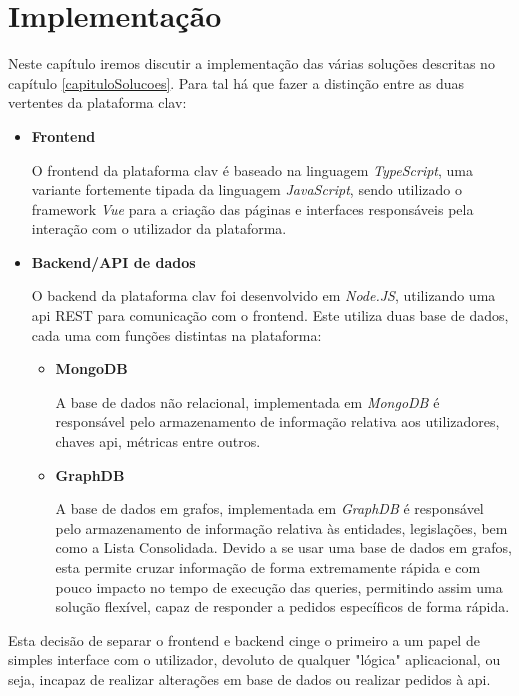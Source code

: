 \chapter{Implementação}

Neste capítulo iremos discutir a implementação das várias soluções descritas no capítulo \ref{capituloSolucoes}. Para tal há que fazer a distinção entre as duas vertentes da plataforma \gls{clav}:

\begin{itemize}
    \item \textbf{Frontend}
    
    O frontend da plataforma \gls{clav} é baseado na linguagem \emph{TypeScript}, uma variante fortemente tipada da linguagem \emph{JavaScript}, sendo utilizado o framework \emph{Vue} para a criação das páginas e interfaces responsáveis pela interação com o utilizador da plataforma.
    
    \item \textbf{Backend/API de dados}
    
    O backend da plataforma \gls{clav} foi desenvolvido em \emph{Node.JS}, utilizando uma \gls{api} REST para comunicação com o frontend. Este utiliza duas base de dados, cada uma com funções distintas na plataforma:
    
    \begin{itemize}
        \item \textbf{MongoDB}
        
        A base de dados não relacional, implementada em \emph{MongoDB} é responsável pelo armazenamento de informação relativa aos utilizadores, chaves \gls{api}, métricas entre outros.
        
        \item \textbf{GraphDB}
        
        A base de dados em grafos, implementada em \emph{GraphDB} é responsável pelo armazenamento de informação relativa às entidades, legislações, bem como a Lista Consolidada. Devido a se usar uma base de dados em grafos, esta permite cruzar informação de forma extremamente rápida e com pouco impacto no tempo de execução das queries, permitindo assim uma solução flexível, capaz de responder a pedidos específicos de forma rápida.
    \end{itemize}
\end{itemize}

Esta decisão de separar o frontend e backend cinge o primeiro a um papel de simples interface com o utilizador, devoluto de qualquer "lógica" aplicacional, ou seja, incapaz de realizar alterações em base de dados ou realizar pedidos à \gls{api}. 


